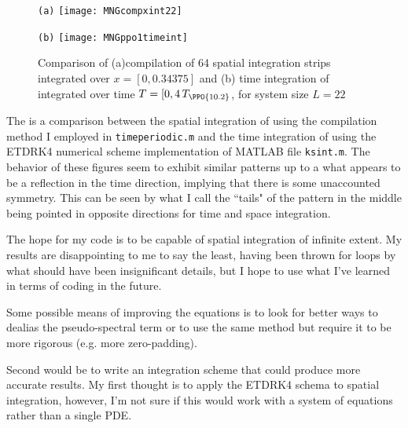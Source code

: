 \begin{figure}[h]
  \begin{minipage}[height=.40\textheight]{.35\textwidth}
    \centering \small{\texttt{(a)}}
    \texttt{[image: MNGcompxint22]}
  \end{minipage}
  \begin{minipage}[height=.40\textheight]{.35\textwidth}
    \centering \small{\texttt{(b)}}
    \texttt{[image: MNGppo1timeint]}
  \end{minipage}
   \caption{Comparison of (a)compilation of 64 spatial integration strips integrated over $x=[0,0.34375]$ and (b) time integration of  integrated over time $T = [0,4\,T_{\PPO{10.2}}$, for system size $L=22$}
  \label{fig:MNGrfig2}
\end{figure}

The  is a comparison between the spatial integration
of  using the compilation method I employed in
\texttt{timeperiodic.m} and the time integration of 
using the ETDRK4 numerical scheme implementation of MATLAB file
\texttt{ksint.m}. The behavior of these figures seem to exhibit similar
patterns up to a what appears to be a reflection in the time direction,
implying that there is some unaccounted symmetry. This can be seen by
what I call the ``tails" of the pattern in the middle being pointed in
opposite directions for time and space integration.

The hope for my code is to be capable of spatial integration of infinite
 extent. My results are disappointing to me to say the least, having been
  thrown for loops by what should have been insignificant details, but
  I hope to use what I've learned in terms of coding in the future.

Some possible means of improving the equations is to look for better ways to
 dealias the pseudo-spectral term or to use the same method but require it to be more rigorous (e.g. more zero-padding).

Second would be to write an integration scheme that could produce more
accurate results. My first thought is to apply the ETDRK4 schema to spatial
 integration, however, I'm not sure if this would work with a system of
 equations rather than a single PDE.

